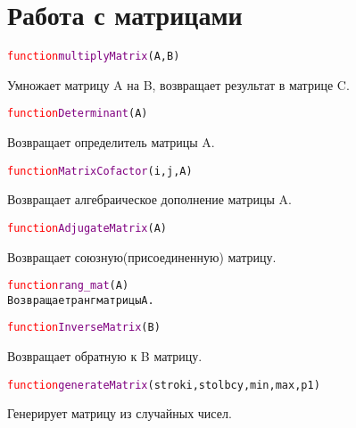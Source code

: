 \documentclass[a4paper,12pt]{article}
\begin{document}
	\section{Работа с матрицами}

	\begin{alltt} 	
		\textcolor{Red}{function} \textcolor{Purple}{multiplyMatrix}(A,B)
	\end{alltt}
	Умножает матрицу A на B, возвращает результат в матрице C.
	\begin{alltt} 	
		\textcolor{Red}{function} \textcolor{Purple}{Determinant}(A)
	\end{alltt}
	Возвращает определитель матрицы A.
	\begin{alltt} 
		\textcolor{Red}{function} \textcolor{Purple}{MatrixCofactor}(i,j,A)
	\end{alltt}
	Возвращает алгебраическое дополнение матрицы A.
	\begin{alltt} 
		\textcolor{Red}{function} \textcolor{Purple}{AdjugateMatrix}(A)
	\end{alltt}
	Возвращает союзную(присоединенную) матрицу.
	\begin{alltt} 	
		\textcolor{Red}{function} \textcolor{Purple}{rang_mat}(А)
	Возвращает ранг матрицы A.
	\end{alltt}
	\begin{alltt} 	
		\textcolor{Red}{function} \textcolor{Purple}{InverseMatrix}(B)
	\end{alltt}
	Возвращает обратную  к B матрицу.
	\begin{alltt} 	
		\textcolor{Red}{function} \textcolor{Purple}{generateMatrix}(stroki,stolbcy,min,max,p1)
	\end{alltt}
	Генерирует матрицу из случайных чисел.
\end{document}
